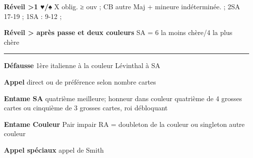 \documentclass[twoside,a4paper]{article}
\newcommand{\g}[1]{\textbf{#1}}
\begin{document}
{\begin{multicols}{2}
	 

	  \g{Réveil >1 ♥/♠} \newline
	 X oblig. ≥ ouv  ; CB autre Maj + mineure indéterminée. ; 2SA 17-19 ; 1SA : 9-12   ; 


	\g{Réveil > après passe et deux couleurs} SA = 6 la moins chère/4	 la plus chère
	 
	 \rule{\linewidth}{1.5pt}
	 		 
	  \g{Défausse} \newline
	  1ère italienne à la couleur \newline
	  Lévinthal à SA
	  
	  
	  \g{Appel} \newline
	 direct ou de préférence selon nombre cartes
	 
	   						 
	 
	 
	 \g{Entame SA} \newline
	quatrième meilleure; honneur dans couleur quatrième de 4 grosses cartes ou cinquième de 3 grosses cartes, roi débloquant


	\g{Entame Couleur} \newline
	Pair impair\newline
	RA = doubleton de la couleur ou singleton autre couleur


	\g{Appel spéciaux} \newline
	appel de Smith

	
	\end{multicols}
	\vspace{-2\parskip}
}
\end{document}
